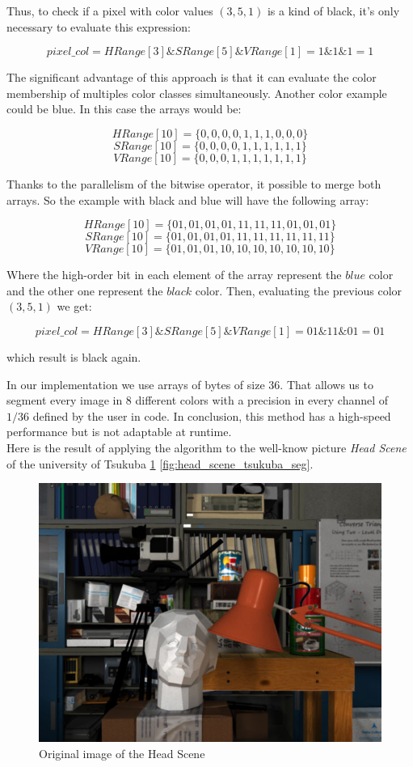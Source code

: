 Thus, to check if a pixel with color values $(3, 5, 1)$ is a kind of black, it's only necessary to evaluate this expression: 

\[ pixel\_col = HRange[3] \& SRange[5] \& VRange[1] = 1 \& 1 \& 1 = 1 \]

The significant advantage of this approach is that it can evaluate the color membership of multiples color classes simultaneously. Another color example could be blue. In this case the arrays would be:

{\centering
\[HRange[10] = \{0, 0, 0, 0, 1, 1, 1, 0, 0, 0\}\]
\[SRange[10] = \{0, 0, 0, 0, 1, 1, 1, 1, 1, 1\}\]
\[VRange[10] = \{0, 0, 0, 1, 1, 1, 1, 1, 1, 1\}\]
}

Thanks to the parallelism of the bitwise operator, it possible to merge both arrays. So the example with black and blue will have the following array:

{\centering
\[HRange[10] = \{01, 01, 01, 01, 11, 11, 11, 01, 01, 01\}\]
\[SRange[10] = \{01, 01, 01, 01, 11, 11, 11, 11, 11, 11\}\]
\[VRange[10] = \{01, 01, 01, 10, 10, 10, 10, 10, 10, 10\}\] 
} 

Where the high-order bit in each element  of the array represent the $blue$ color and the other one represent the $black$ color. Then, evaluating the previous color $(3,5,1)$ we get: 

\[pixel\_col = HRange[3] \& SRange[5] \& VRange[1] = 01 \& 11 \& 01 = 01\]

which result is black again.

In our implementation we use arrays of bytes of size 36. That allows us to segment every image in 8 different colors with a precision in every channel of $1/36$ defined by the user in code. In conclusion, this method has a high-speed performance but is not adaptable at runtime. \\

Here is the result of applying the algorithm to the well-know picture \textit{Head Scene} of the university of Tsukuba \ref{fig:head_scene_tsukuba_ori} \ref{fig:head_scene_tsukuba_seg}. \\


\begin{figure}[hbp]
	\centering
	\includegraphics[width=0.4\linewidth]{../Images/c2/head_scene_tsukuba_ori}
	\caption{Original image of the Head Scene}
	\label{fig:head_scene_tsukuba_ori}
\end{figure}

